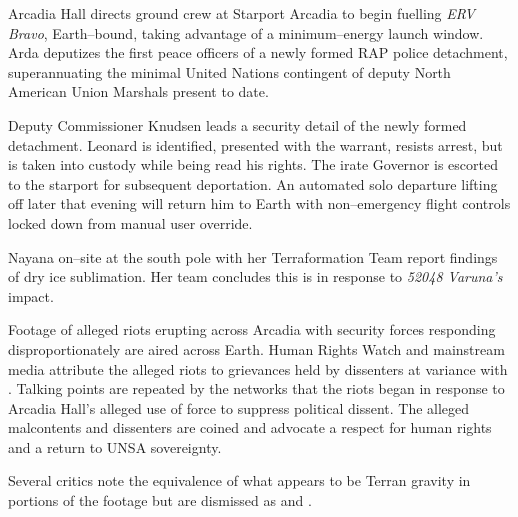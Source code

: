 Arcadia Hall directs ground crew at Starport Arcadia to begin fuelling {\it ERV Bravo}, Earth--bound, taking advantage of a minimum--energy launch window. Arda deputizes the first peace officers of a newly formed RAP police detachment, superannuating the minimal United Nations contingent of deputy North American Union Marshals present to date.

Deputy Commissioner Knudsen leads a security detail of the newly formed detachment. Leonard is identified, presented with the warrant, resists arrest, but is taken into custody while being read his rights. The irate Governor is escorted to the starport for subsequent deportation. An automated solo departure lifting off later that evening will return him to Earth with non--emergency flight controls locked down from manual user override.
\StopTimelineDate

Nayana on--site at the south pole with her Terraformation Team report findings of dry ice sublimation. Her team concludes this is in response to {\it 52048 Varuna's} impact.
\StopTimelineDate

Footage of alleged riots erupting across Arcadia with security forces responding disproportionately are aired across Earth. Human Rights Watch and mainstream media attribute the alleged riots to grievances held by dissenters at variance with . Talking points are repeated by the networks that the riots began in response to Arcadia Hall's alleged use of force to suppress political dissent. The alleged malcontents and dissenters are coined  and advocate a respect for human rights and a return to UNSA sovereignty.

Several critics note the equivalence of what appears to be Terran gravity in portions of the footage but are dismissed as  and .
\StopTimelineDate

